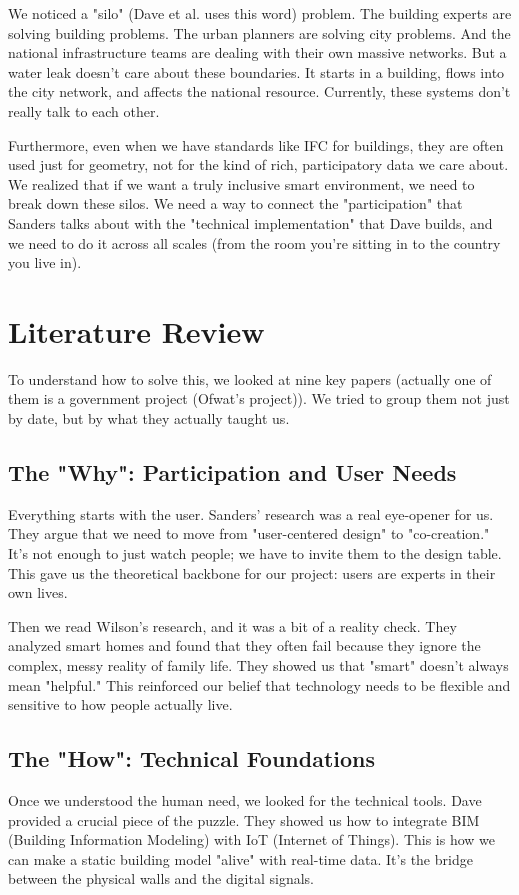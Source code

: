 \documentclass[a4paper,oneside,12pt]{report}
\begin{document}
We noticed a "silo" (Dave et al.\cite{Dave2018} uses this word) problem. The building experts are solving building problems. The urban planners are solving city problems. And the national infrastructure teams are dealing with their own massive networks. But a water leak doesn't care about these boundaries. It starts in a building, flows into the city network, and affects the national resource. Currently, these systems don't really talk to each other.

Furthermore, even when we have standards like IFC for buildings, they are often used just for geometry, not for the kind of rich, participatory data we care about. We realized that if we want a truly inclusive smart environment, we need to break down these silos. We need a way to connect the "participation" that Sanders talks about with the "technical implementation" that Dave builds, and we need to do it across all scales (from the room you're sitting in to the country you live in).

\chapter{Literature Review}

To understand how to solve this, we looked at nine key papers (actually one of them is a government project (Ofwat's project\cite{ThamesWater2024})). We tried to group them not just by date, but by what they actually taught us.

\section{The "Why": Participation and User Needs}
Everything starts with the user. Sanders' research\cite{Sanders2008} was a real eye-opener for us. They argue that we need to move from "user-centered design" to "co-creation." It's not enough to just watch people; we have to invite them to the design table. This gave us the theoretical backbone for our project: users are experts in their own lives.

Then we read Wilson's research\cite{Wilson2015}, and it was a bit of a reality check. They analyzed smart homes and found that they often fail because they ignore the complex, messy reality of family life. They showed us that "smart" doesn't always mean "helpful." This reinforced our belief that technology needs to be flexible and sensitive to how people actually live.

\section{The "How": Technical Foundations}
Once we understood the human need, we looked for the technical tools. Dave\cite{Dave2018} provided a crucial piece of the puzzle. They showed us how to integrate BIM (Building Information Modeling) with IoT (Internet of Things). This is how we can make a static building model "alive" with real-time data. It's the bridge between the physical walls and the digital signals.
\end{document}
